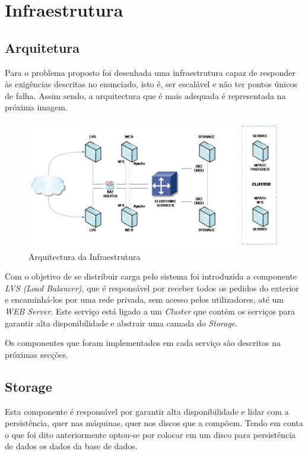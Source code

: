 \section{Infraestrutura}

\subsection{Arquitetura}

Para o problema proposto foi desenhada uma infraestrutura capaz de responder às exigências descritas no enunciado, isto é, ser escalável e não ter pontos únicos de falha. Assim sendo, a arquitectura que é mais adequada é representada na próxima imagem.

\begin{figure}[!h]
\centering
\includegraphics[scale=.6]{img/estrutura.png}
\caption{Arquitectura da Infraestrutura}
\end{figure}

Com o objetivo de se distribuir carga pelo sistema foi introduzida a componente \textit{LVS (Load Balancer)}, que é responsável por receber todos os pedidos do exterior e encaminhá-los por uma rede privada, sem acesso pelos utilizadores, até um \textit{WEB Server}. Este serviço está ligado a um \textit{Cluster} que contém os serviços para garantir alta disponibilidade e abstrair uma camada do \textit{Storage}.

Os componentes que foram implementados em cada serviço são descritos na próximas secções.

\subsection{Storage}
Esta componente é responsável por garantir alta disponibilidade e lidar com a persistência, quer nas máquinas, quer nos discos que a compõem. Tendo em conta o que foi dito anteriormente optou-se por colocar em um disco para persistência de dados os dados da base de dados.


